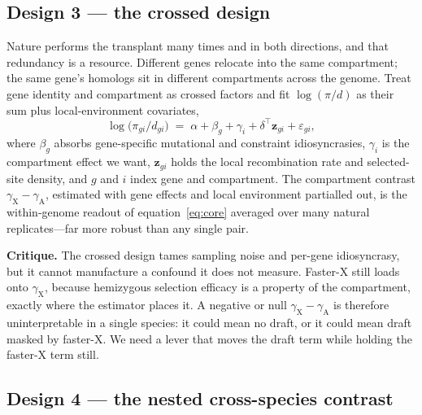 \documentclass[11pt,a4paper]{article}
\begin{document}
\subsection{Design 3 --- the crossed design}

Nature performs the transplant many times and in both directions, and that redundancy is a resource. Different genes relocate into the same compartment; the same gene's homologs sit in different compartments across the genome. Treat gene identity and compartment as crossed factors and fit $\log(\pi/d)$ as their sum plus local-environment covariates,
\begin{equation}
    \log\!\big(\pi_{gi}/d_{gi}\big) \;=\; \alpha + \beta_g + \gamma_i + \delta^{\!\top}\!\mathbf{z}_{gi} + \varepsilon_{gi},
    \label{eq:mixed}
\end{equation}
where $\beta_g$ absorbs gene-specific mutational and constraint idiosyncrasies, $\gamma_i$ is the compartment effect we want, $\mathbf{z}_{gi}$ holds the local recombination rate and selected-site density, and $g$ and $i$ index gene and compartment. The compartment contrast $\gamma_{\mathrm X} - \gamma_{\mathrm A}$, estimated with gene effects and local environment partialled out, is the within-genome readout of equation~\eqref{eq:core} averaged over many natural replicates---far more robust than any single pair.

\textbf{Critique.} The crossed design tames sampling noise and per-gene idiosyncrasy, but it cannot manufacture a confound it does not measure. Faster-X still loads onto $\gamma_{\mathrm X}$, because hemizygous selection efficacy is a property of the compartment, exactly where the estimator places it. A negative or null $\gamma_{\mathrm X} - \gamma_{\mathrm A}$ is therefore uninterpretable in a single species: it could mean no draft, or it could mean draft masked by faster-X. We need a lever that moves the draft term while holding the faster-X term still.

\subsection{Design 4 --- the nested cross-species contrast}
\label{sec:nested}
\end{document}
